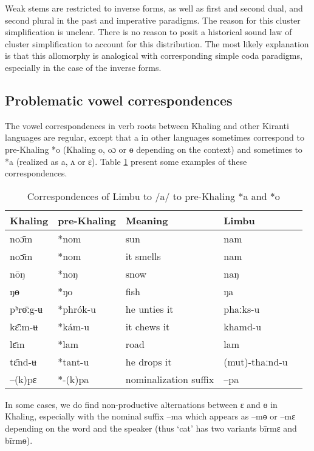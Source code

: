 \documentclass[oldfontcommands,oneside,a4paper,11pt]{article}
\newcommand{\ipa}[1]{{\phon \mbox{#1}}} %
\begin{document}
Weak stems are restricted to inverse forms, as well as first and second dual, and second plural in the past and imperative paradigms. The reason for this cluster simplification is unclear. There is no reason to posit a historical sound law of cluster simplification to account for this distribution. The most likely explanation is that this allomorphy is analogical with corresponding simple coda paradigms, especially in the case of the inverse forms.


\subsection{Problematic vowel correspondences} \label{sec:vowel.correspondences}

The vowel correspondences in verb roots between Khaling and other Kiranti languages are regular, except that \ipa{a} in other languages sometimes correspond to pre-Khaling  \ipa{*o} (Khaling \ipa{o}, \ipa{oɔ} or \ipa{ɵ} depending on the context) and sometimes to  \ipa{*a} (realized as \ipa{a}, \ipa{ʌ} or \ipa{ɛ}). Table \ref{tab:correspondances.a} present some examples of these correspondences.
 
\begin{table}[H]
\caption{Correspondences of Limbu to /a/ to pre-Khaling  \ipa{*a} and  \ipa{*o}} \centering \label{tab:correspondances.a}
\begin{tabular}{lllll}
Khaling &   pre-Khaling & Meaning &   Limbu \\
\midrule
\ipa{noɔ̄m} &  \ipa{*nom} & sun &   \ipa{nam}\\
\ipa{noɔ̄m} &  \ipa{*nom} & it smells &   \ipa{nam}\\
\ipa{nōŋ} &  \ipa{*noŋ} & snow&   \ipa{naŋ}\\
\ipa{ŋɵ} &  \ipa{*ŋo} & fish&   \ipa{ŋa}\\
\ipa{pʰrɵ̄ːg-ʉ} &  \ipa{*phrók-u} & he unties it & \ipa{phaːks-u} \\
\midrule
\ipa{kɛ̄ːm-ʉ} &  \ipa{*kám-u} & it chews it & \ipa{khamd-u} \\
\ipa{lɛ̄m} &  \ipa{*lam} & road & \ipa{lam} \\
\ipa{tɛ̄nd-ʉ} & \ipa{*tant-u} & he drops it & \ipa{(mut)-thaːnd-u}\\
\ipa{--(k)pɛ} & \ipa{*-(k)pa} & nominalization suffix & \ipa{--pa} \\
\bottomrule
\end{tabular}
\end{table}
In some cases, we do find non-productive alternations between \ipa{ɛ} and \ipa{ɵ} in Khaling, especially with the nominal suffix \ipa{--ma} which appears as \ipa{--mɵ} or \ipa{--mɛ} depending on the word and the speaker (thus `cat' has two variants \ipa{bīrmɛ} and \ipa{bīrmɵ}). 
\end{document}
